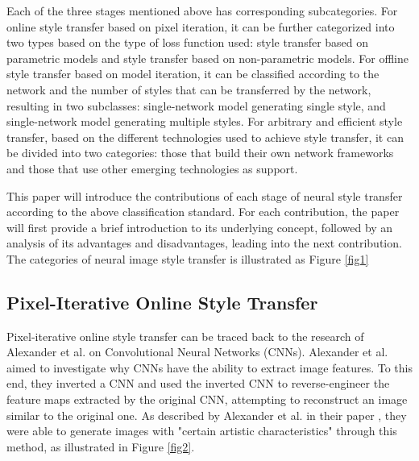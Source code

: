 \documentclass[preprint,12pt]{elsarticle}
\begin{document}
Each of the three stages mentioned above has corresponding subcategories. For online style transfer based on pixel iteration, it can be further categorized into two types based on the type of loss function used: style transfer based on parametric models and style transfer based on non-parametric models. For offline style transfer based on model iteration, it can be classified according to the network and the number of styles that can be transferred by the network, resulting in two subclasses: single-network model generating single style, and single-network model generating multiple styles. For arbitrary and efficient style transfer, based on the different technologies used to achieve style transfer, it can be divided into two categories: those that build their own network frameworks and those that use other emerging technologies as support.

This paper will introduce the contributions of each stage of neural style transfer according to the above classification standard. For each contribution, the paper will first provide a brief introduction to its underlying concept, followed by an analysis of its advantages and disadvantages, leading into the next contribution. The categories of neural image style transfer is illustrated as Figure \ref{fig1}

\subsection{Pixel-Iterative Online Style Transfer}

Pixel-iterative online style transfer can be traced back to the research of Alexander et al. \citep{24mordvintsev2015inceptionism} on Convolutional Neural Networks (CNNs). Alexander et al. \citep{24mordvintsev2015inceptionism} aimed to investigate why CNNs have the ability to extract image features. To this end, they inverted a CNN and used the inverted CNN to reverse-engineer the feature maps extracted by the original CNN, attempting to reconstruct an image similar to the original one. As described by Alexander et al. in their paper \citep{24mordvintsev2015inceptionism}, they were able to generate images with "certain artistic characteristics" through this method, as illustrated in Figure \ref{fig2}.
\end{document}
